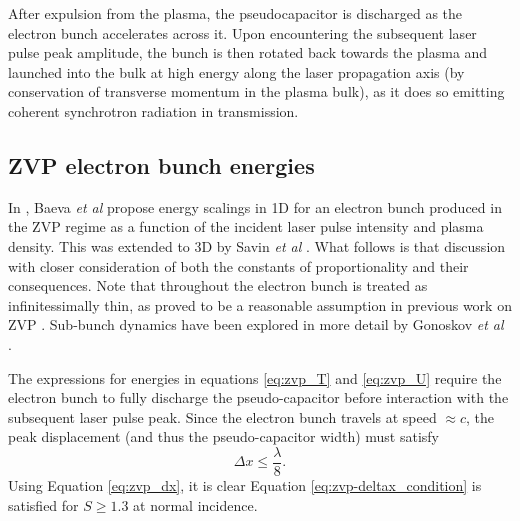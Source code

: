 After expulsion from the plasma, the pseudocapacitor is discharged as the electron bunch accelerates across it. Upon encountering the subsequent laser pulse peak amplitude, the bunch is then rotated back towards the plasma and launched into the bulk at high energy along the laser propagation axis (by conservation of transverse momentum in the plasma bulk), as it does so emitting coherent synchrotron radiation in transmission.

\subsection{ZVP electron bunch energies}\label{sec:zvp_energies_derivation}
In \cite{baevaZeroVectorPotential2011}, Baeva \textit{et al} propose energy scalings in \ac{1D} for an electron bunch produced in the \ac{ZVP} regime as a function of the incident laser pulse intensity and plasma density. This was extended to \ac{3D} by Savin \textit{et al} \cite{savinAttosecondscaleAbsorptionExtreme2017}. What follows is that discussion with closer consideration of both the constants of proportionality and their consequences. Note that throughout the electron bunch is treated as infinitessimally thin, as proved to be a reasonable assumption in previous work on ZVP \cite{baevaTheoryHighorderHarmonic2006, savinAttosecondscaleAbsorptionExtreme2017, savinEnergyAbsorptionLaserQED2019}. Sub-bunch dynamics have been explored in more detail by Gonoskov \textit{et al} \cite{gonoskovTheoryRelativisticRadiation2018}.

The expressions for energies in equations \ref{eq:zvp_T} and \ref{eq:zvp_U} require the electron bunch to fully discharge the pseudo-capacitor before interaction with the subsequent laser pulse peak. Since the electron bunch travels at speed $\approx c$, the peak displacement (and thus the pseudo-capacitor width) must satisfy
\begin{equation}\label{eq:zvp-deltax_condition}
	\Delta x \le \frac{\lambda}{8}.
\end{equation}
Using Equation \ref{eq:zvp_dx}, it is clear Equation \ref{eq:zvp-deltax_condition} is satisfied for $ S\ge 1.3$ at normal incidence.

